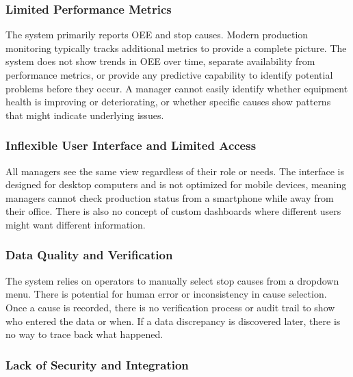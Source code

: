 \subsubsection{\fontsize{13}{16}\selectfont Limited Performance Metrics}

\hspace*{\parindent} The system primarily reports OEE and stop causes. Modern production monitoring typically tracks additional metrics to provide a complete picture. The system does not show trends in OEE over time, separate availability from performance metrics, or provide any predictive capability to identify potential problems before they occur. A manager cannot easily identify whether equipment health is improving or deteriorating, or whether specific causes show patterns that might indicate underlying issues.

\subsubsection{\fontsize{13}{16}\selectfont Inflexible User Interface and Limited Access}

\hspace*{\parindent} All managers see the same view regardless of their role or needs. The interface is designed for desktop computers and is not optimized for mobile devices, meaning managers cannot check production status from a smartphone while away from their office. There is also no concept of custom dashboards where different users might want different information.

\subsubsection{\fontsize{13}{16}\selectfont Data Quality and Verification}

\hspace*{\parindent} The system relies on operators to manually select stop causes from a dropdown menu. There is potential for human error or inconsistency in cause selection. Once a cause is recorded, there is no verification process or audit trail to show who entered the data or when. If a data discrepancy is discovered later, there is no way to trace back what happened.

\subsubsection{\fontsize{13}{16}\selectfont Lack of Security and Integration}

